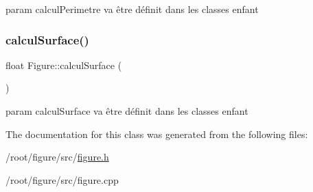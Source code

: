 param calcul\+Perimetre va être définit dans les classes enfant \mbox{\label{classFigure_aa099ec99ff69eb0e4f989af6a8ea9350}} 
\subsubsection{\texorpdfstring{calcul\+Surface()}{calculSurface()}}
{\footnotesize\ttfamily float Figure\+::calcul\+Surface (\begin{DoxyParamCaption}{ }\end{DoxyParamCaption})\hspace{0.3cm}{\ttfamily [virtual]}}

param calcul\+Surface va être définit dans les classes enfant 

The documentation for this class was generated from the following files\+:\begin{DoxyCompactItemize}
\item 
/root/figure/src/\hyperlink{figure_8h}{figure.\+h}\item 
/root/figure/src/figure.\+cpp\end{DoxyCompactItemize}
